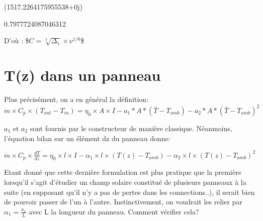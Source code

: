 \documentclass[letterpaper,10pt,english]{sphinxmanual}
\begin{document}
\begin{sphinxVerbatim}[commandchars=\\\{\}]
(\PYGZhy{}1517.2264175955538+0j)
\end{sphinxVerbatim}

\begin{sphinxVerbatim}[commandchars=\\\{\}]
   
\end{sphinxVerbatim}

\begin{sphinxVerbatim}[commandchars=\\\{\}]
\PYGZhy{}0.7977724087046312
\end{sphinxVerbatim}

D’où :
\$\(
C = \sqrt[3]{\Delta_1} \times \nu^{1/6}
\)\$


\chapter{T(z) dans un panneau}
\label{\detokenize{Part4/FlatPlate:t-z-dans-un-panneau}}\label{\detokenize{Part4/FlatPlate::doc}}
Plus précisément, on a en général la définition: \(\dot{m} \times C_p \times (T_{out}-T_{in}) = \eta_0 \times A \times I - a_1 * A* (\bar{T}-T_{amb}) - a_2*A*(\bar{T}-T_{amb})^2 \)

\(a_1\) et \(a_2\) sont fournis par le constructeur de manière classique. Néanmoins, l’équation bilan sur un élément dz du panneau donne:

\(\dot{m} \times C_p \times \frac{dT}{dz} = \eta_0 \times l \times I -\alpha_1 \times l \times (T(z)-T_{amb})-\alpha_2 \times l \times (T(z)-T_{amb})^2\)

Etant donné que cette dernière formulation est plus pratique que la première lorsqu’il s’agit d’étudier un champ solaire constitué de plusieurs panneaux à la suite (en supposant qu’il n’y a pas de pertes dans les connections..), il serait bien de pouvoir passer de l’un à l’autre. Instinctivement, on voudrait les relier par \( \alpha_1 = \frac{a_1}{L} \) avec L la longueur du panneau. Comment vérifier cela?
\end{document}
